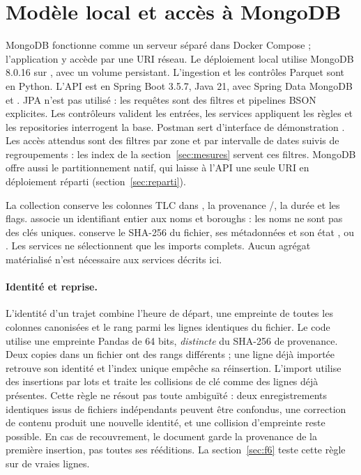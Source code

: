 \section{Modèle local et accès à MongoDB}\label{sec:modele}
MongoDB fonctionne comme un serveur séparé dans Docker Compose ; l'application
y accède par une URI réseau. Le déploiement local utilise MongoDB 8.0.16 sur
, avec un volume persistant. L'ingestion et les contrôles
Parquet sont en Python. L'API est en Spring Boot 3.5.7, Java 21, avec Spring Data
MongoDB et . JPA n'est pas utilisé : les requêtes sont des
filtres et pipelines BSON explicites. Les contrôleurs valident les entrées, les
services appliquent les règles et les repositories interrogent la base. Postman
sert d'interface de démonstration \cite{sujet,code}. Les accès attendus sont des filtres par zone et par
intervalle de dates suivis de regroupements : les index de la section~\ref{sec:mesures}
servent ces filtres. MongoDB offre aussi le partitionnement natif, qui laisse à l'API
une seule URI en déploiement réparti (section~\ref{sec:reparti}).

La collection  conserve les colonnes TLC dans , la provenance
/, la durée  et les
flags.  associe un identifiant entier aux noms et boroughs : les noms
ne sont pas des clés uniques.  conserve le SHA-256 du fichier,
ses métadonnées et son état ,  ou .
Les services ne sélectionnent que les imports complets. Aucun agrégat matérialisé
n'est nécessaire aux services décrits ici.

\paragraph{Identité et reprise.}
L'identité d'un trajet combine l'heure de départ, une empreinte de toutes les
colonnes canonisées et le rang parmi les lignes identiques du fichier. Le code
utilise une empreinte Pandas de 64 bits, \emph{distincte} du SHA-256 de provenance.
Deux copies dans un fichier ont des rangs différents ; une ligne déjà importée
retrouve son identité et l'index unique  empêche sa réinsertion.
L'import utilise des insertions par lots et traite les collisions de clé
comme des lignes déjà présentes.
Cette règle ne résout pas toute ambiguïté : deux enregistrements identiques issus
de fichiers indépendants peuvent être confondus, une correction de contenu
produit une nouvelle identité, et une collision d'empreinte reste possible.
En cas de recouvrement, le document garde la provenance de la première insertion,
pas toutes ses rééditions. La section~\ref{sec:f6} teste cette règle sur de vraies lignes.


